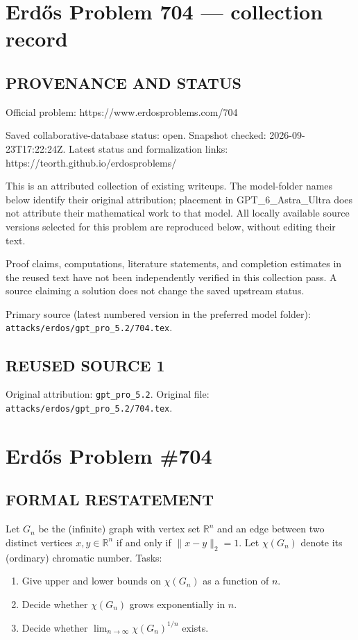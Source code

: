 \section*{Erd\H{o}s Problem 704 --- collection record}

\subsection*{PROVENANCE AND STATUS}
Official problem: https://www.erdosproblems.com/704

Saved collaborative-database status: open.
Snapshot checked: 2026-09-23T17:22:24Z.
Latest status and formalization links: https://teorth.github.io/erdosproblems/

This is an attributed collection of existing writeups. The model-folder names below identify their original attribution; placement in GPT\_6\_Astra\_Ultra does not attribute their mathematical work to that model. All locally available source versions selected for this problem are reproduced below, without editing their text.

Proof claims, computations, literature statements, and completion estimates in the reused text have not been independently verified in this collection pass. A source claiming a solution does not change the saved upstream status.

Primary source (latest numbered version in the preferred model folder): \texttt{attacks/erdos/gpt\_pro\_5.2/704.tex}.

\subsection*{REUSED SOURCE 1}
Original attribution: \texttt{gpt\_pro\_5.2}.
Original file: \texttt{attacks/erdos/gpt\_pro\_5.2/704.tex}.

\section*{Erd\H{o}s Problem \#704}

\subsection*{FORMAL RESTATEMENT}
Let $G_n$ be the (infinite) graph with vertex set $\mathbb{R}^n$ and an edge between two distinct vertices $x,y\in\mathbb{R}^n$ if and only if $\|x-y\|_2=1$.
Let $\chi(G_n)$ denote its (ordinary) chromatic number.
Tasks:
\begin{enumerate}
\item Give upper and lower bounds on $\chi(G_n)$ as a function of $n$.
\item Decide whether $\chi(G_n)$ grows exponentially in $n$.
\item Decide whether $\lim_{n\to\infty} \chi(G_n)^{1/n}$ exists.
\end{enumerate}

